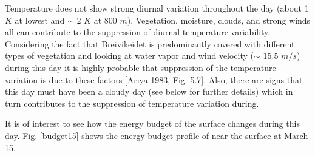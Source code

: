 \documentclass[a4paper,12pt]{article}
\numberwithin{equation}{section} %
\begin{document}
Temperature does not show strong diurnal variation throughout the day (about 1 $K$ at lowest and $\sim$ 2 $K$ at 800 $m$). Vegetation, moisture, clouds, and strong winds all can contribute to the suppression of diurnal temperature variability. Considering the fact that Breivikeidet is predominantly covered with different types of vegetation and looking at water vapor and wind velocity ($\sim$ 15.5 $m/s$) during this day it is highly probable that suppression of the temperature variation is due to these factors [Ariya 1983, Fig. 5.7]. Also, there are signs that this day must have been a cloudy day (see below for further details) which in turn contributes to the suppression of temperature variation during.


It is of interest to see how the energy budget of the surface changes during this day. Fig. \ref{budget15} shows the energy budget profile of near the surface at March 15.
\end{document}
